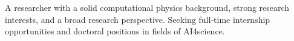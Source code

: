 




\vspace{6pt}

\begin{cvparagraph}
A researcher with a solid computational physics background, strong research interests, and a broad research perspective. Seeking full-time internship opportunities and doctoral positions in fields of AI4science.
\end{cvparagraph}

\vspace{2pt}
